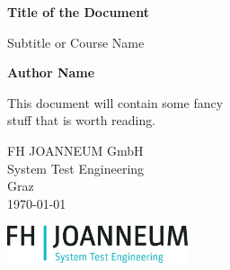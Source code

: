 \begin{titlepage}
    \centering
    \vspace*{1cm}
    
    \Huge
    \textbf{Title of the Document}
    
    \vspace{0.5cm}
    \LARGE
    Subtitle or Course Name
    
    \vspace{1.5cm}
    
    \textbf{Author Name}
    
    \vfill
    
   This document will contain some fancy \\
   stuff that is worth reading.
    
    \vspace{0.8cm}
    
    \Large
    FH JOANNEUM GmbH\\
    System Test Engineering\\
    Graz\\
    \today
    
    \vspace{2cm}
    
    \includegraphics[width=0.4\textwidth]{figures/logo_fhj_stm.jpg}
    
    \vspace{3cm}
\end{titlepage}
